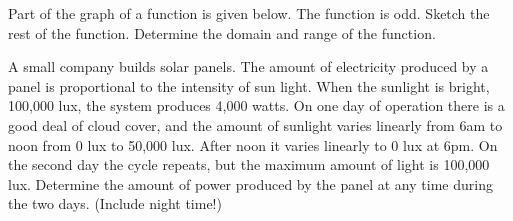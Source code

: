 \begin{problem}
\begin{tikzpicture}[y=1.0cm, x=1.0cm,font=\sffamily]
      \end{tikzpicture}

    \item Part of the graph of a function is given below. The function
      is odd. Sketch the rest of the function. Determine the domain
      and range of the function.


      \clearpage

    \item A small company builds solar panels. The amount of
      electricity produced by a panel is proportional to the intensity
      of sun light. When the sunlight is bright, 100,000 lux, the
      system produces 4,000 watts. On one day of operation there is a
      good deal of cloud cover, and the amount of sunlight varies
      linearly from 6am to noon from 0 lux to 50,000 lux. After noon
      it varies linearly to 0 lux at 6pm. On the second day the cycle
      repeats, but the maximum amount of light is 100,000
      lux. Determine the amount of power produced by the panel at any
      time during the two days. (Include night time!)


\end{problem}
